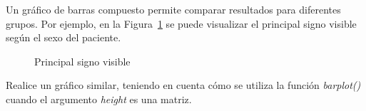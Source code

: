 \documentclass{prob}
\begin{document}
	\begin{problema}
	Un gráfico de barras compuesto permite comparar resultados para diferentes grupos. Por ejemplo, en la Figura~\ref{fig:plot03} se puede visualizar el principal signo visible según el sexo del paciente.
\begin{figure}[!ht]
    \centering
    
    \caption{Principal signo visible}
    \label{fig:plot03}
\end{figure}	
	\end{problema}

	Realice un gráfico similar, teniendo en cuenta cómo se utiliza la función \textit{barplot()} cuando el argumento \textit{height} es una matriz. 
\end{document}
